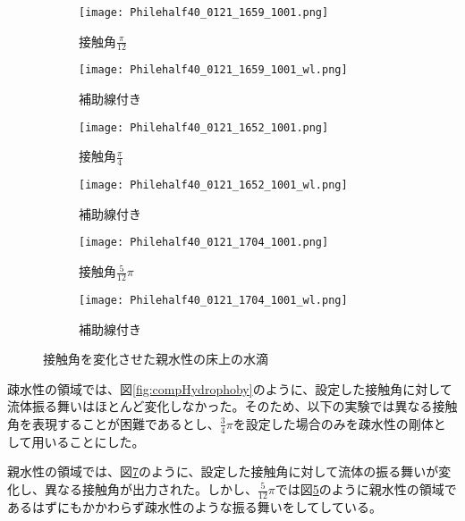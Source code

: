 \documentclass[]{jsarticle}
\begin{document}
\begin{figure}[H]
  \centering
  \begin{subfigure}{0.45\columnwidth}
    \centering
    \texttt{[image: Philehalf40\_0121\_1659\_1001.png]}
    \caption{接触角$\frac{\pi}{12}$}
    \label{fig:phile_pi6}
  \end{subfigure}
  \begin{subfigure}{0.45\columnwidth}
    \centering
    \texttt{[image: Philehalf40\_0121\_1659\_1001\_wl.png]}
    \caption{補助線付き}
    \label{fig:phile_pi6wl}
  \end{subfigure}

  \begin{subfigure}{0.45\columnwidth}
    \centering
    \texttt{[image: Philehalf40\_0121\_1652\_1001.png]}
    \caption{接触角$\frac{\pi}{4}$}
    \label{fig:phile_pi4}
  \end{subfigure}
  \begin{subfigure}{0.45\columnwidth}
    \centering
    \texttt{[image: Philehalf40\_0121\_1652\_1001\_wl.png]}
    \caption{補助線付き}
    \label{fig:phile_pi4wl}
  \end{subfigure}
  \begin{subfigure}{0.45\columnwidth}
    \centering
    \texttt{[image: Philehalf40\_0121\_1704\_1001.png]}
    \caption{接触角$\frac{5}{12}\pi$}
    \label{fig:phile_pi3}
  \end{subfigure}
  \begin{subfigure}{0.45\columnwidth}
    \centering
    \texttt{[image: Philehalf40\_0121\_1704\_1001\_wl.png]}
    \caption{補助線付き}
    \label{fig:phile_pi3wl}
  \end{subfigure}

  \caption{接触角を変化させた親水性の床上の水滴}
  \label{fig:compHydrophile}
\end{figure}

疎水性の領域では、図\ref{fig:compHydrophoby}のように、設定した接触角に対して流体振る舞いはほとんど変化しなかった。そのため、以下の実験では異なる接触角を表現することが困難であるとし、$\frac{3}{4}\pi$を設定した場合のみを疎水性の剛体として用いることにした。

親水性の領域では、図\ref{fig:compHydrophile}のように、設定した接触角に対して流体の振る舞いが変化し、異なる接触角が出力された。しかし、$\frac{5}{12}\pi$では図\ref{fig:phile_pi3}のように親水性の領域であるはずにもかかわらず疎水性のような振る舞いをしてしている。
\end{document}
